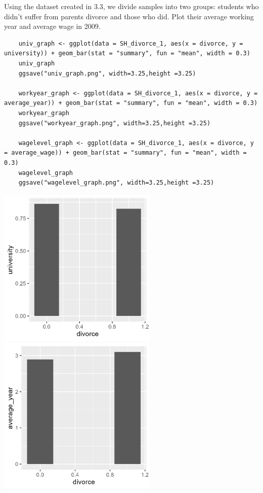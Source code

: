 \documentclass[11pt, letterpaper]{article}
\begin{document}
Using the dataset created in 3.3, we divide samples into two groups: students who didn't suffer from parents divorce and those who did.
Plot their average working year and average wage in 2009. 

\begin{lstlisting}
    univ_graph <- ggplot(data = SH_divorce_1, aes(x = divorce, y = university)) + geom_bar(stat = "summary", fun = "mean", width = 0.3)
    univ_graph
    ggsave("univ_graph.png", width=3.25,height =3.25)

    workyear_graph <- ggplot(data = SH_divorce_1, aes(x = divorce, y = average_year)) + geom_bar(stat = "summary", fun = "mean", width = 0.3)
    workyear_graph
    ggsave("workyear_graph.png", width=3.25,height =3.25)

    wagelevel_graph <- ggplot(data = SH_divorce_1, aes(x = divorce, y = average_wage)) + geom_bar(stat = "summary", fun = "mean", width = 0.3)
    wagelevel_graph
    ggsave("wagelevel_graph.png", width=3.25,height =3.25)

\end{lstlisting}

\includegraphics[height=3in]{univ_graph.png} 
\includegraphics[height=3in]{workyear_graph.png}
\end{document}

